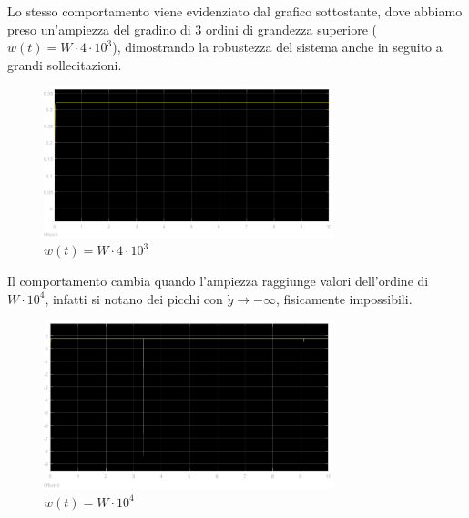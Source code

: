 \documentclass{article}
\begin{document}
\noindent
Lo stesso comportamento viene evidenziato dal grafico sottostante, dove abbiamo preso un'ampiezza del gradino di 3 ordini di grandezza superiore ($w(t)=W\cdot4\cdot10^3$), dimostrando la robustezza del sistema anche in seguito a grandi sollecitazioni.

\begin{figure}[!h]
    \centering
     \includegraphics[width=0.75\textwidth]{grafici/grafico_W_4e3.png}
     \caption*{$w(t)=W\cdot4\cdot10^3$}
\end{figure}

\newpage
\noindent
Il comportamento cambia quando l'ampiezza raggiunge valori dell'ordine di $W\cdot10^4$, infatti si notano dei picchi con $\dot{y}\longrightarrow-\infty$, fisicamente impossibili.

\begin{figure}[!h]
    \centering
    \includegraphics[width=0.75\textwidth]{grafici/grafico_W_1e4.png}
    \caption*{$w(t)=W\cdot10^4$}
\end{figure}
\end{document}
